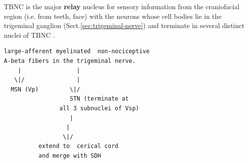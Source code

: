 TBNC is the major {\bf relay} nucleus for sensory information from the
craniofacial region (i.e. from teeth, face) with the neurons whose cell bodies
lie in the trigeminal ganglion (Sect.\ref{sec:trigeminal-nerve}) and terminate
in several distinct nuclei of TBNC \citep{dostrovsky2006}.
\begin{verbatim}
large-afferent myelinated  non-nociceptive 
A-beta fibers in the trigeminal nerve.
    |                |
   \|/               |
  MSN (Vp)         \|/
                   STN (terminate at 
                all 3 subnuclei of Vsp)
                   |
                  |
                 \|/
          extend to  cerical cord
          and merge with SDH       
\end{verbatim}
% 
%   
% 
% 

